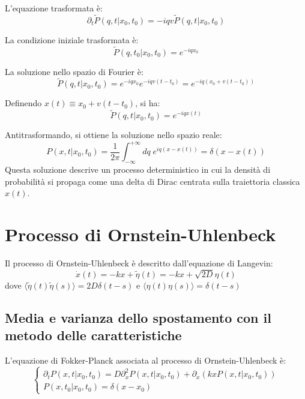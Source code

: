 L'equazione trasformata è:
\begin{equation}
\partial_t \tilde{P}(q,t|x_0,t_0) = -iqv \tilde{P}(q,t|x_0,t_0)
\end{equation}

La condizione iniziale trasformata è:
\begin{equation}
\tilde{P}(q,t_0|x_0,t_0) = e^{-iqx_0}
\end{equation}

La soluzione nello spazio di Fourier è:
\begin{equation}
\tilde{P}(q,t|x_0, t_0) = e^{-iqx_0} e^{-iqv(t-t_0)} = e^{-iq(x_0 + v(t-t_0))}
\end{equation}

Definendo $x(t) \equiv x_0 + v(t-t_0)$, si ha:
\begin{equation}
\tilde{P}(q,t|x_0, t_0) = e^{-iqx(t)}
\end{equation}

Antitrasformando, si ottiene la soluzione nello spazio reale:
\begin{equation}
P(x,t|x_{0},t_{0})=\frac{1}{2\pi}\int_{-\infty}^{+\infty}dq \;e^{iq(x-x(t))} = \delta(x-x(t))
\end{equation}
Questa soluzione descrive un processo deterministico in cui la densità di probabilità si propaga come una delta di Dirac centrata sulla traiettoria classica $x(t)$.

\section{Processo di Ornstein-Uhlenbeck}
Il processo di Ornstein-Uhlenbeck è descritto dall'equazione di Langevin:
\begin{equation}
\dot{x}(t) = -kx + \tilde{\eta}(t) = -kx + \sqrt{2D}\eta(t)
\end{equation}
dove $\langle \tilde{\eta}(t)\tilde{\eta}(s) \rangle = 2D\delta(t-s)$ e $\langle \eta(t)\eta(s) \rangle = \delta(t-s)$

\subsection{Media e varianza dello spostamento con il metodo delle caratteristiche}
L'equazione di Fokker-Planck associata al processo di Ornstein-Uhlenbeck è:
\begin{equation} \begin{cases}
\partial_{t}P(x,t|x_{0},t_{0})=D\partial_{x}^{2}P(x,t|x_{0},t_{0}) + \partial_{x}(kx P(x,t|x_{0},t_{0})) \\ P(x,t_{0}|x_{0},t_{0})=\delta(x-x_{0}) \end{cases}
\end{equation}

